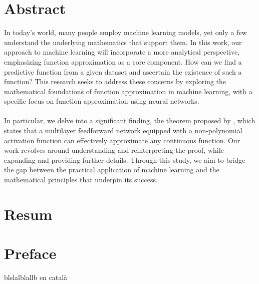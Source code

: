 \documentclass[../../main.tex]{subfiles}
\begin{document}
\chapter*{Abstract}\label{ch:abstract} 
\noindent In today's world, many people employ machine learning models, yet only a few understand the underlying mathematics that support them. In this work, our approach to machine learning will incorporate a more analytical perspective, emphasizing function approximation as a core component. How can we find a predictive function from a given dataset and ascertain the existence of such a function? This research seeks to address these concerns by exploring the mathematical foundations of function approximation in machine learning, with a specific focus on function approximation using neural networks.
\\ \\
In particular, we delve into a significant finding, the theorem proposed by \cite{leshno1993multilayer}, which states that a multilayer feedforward network equipped with a non-polynomial activation function can effectively approximate any continuous function. Our work revolves around understanding and reinterpreting the proof, while expanding and providing further details.
Through this study, we aim to bridge the gap between the practical application of machine learning and the mathematical principles that underpin its success.




\chapter*{Resum}

\chapter*{Preface}



blslalblallb en català
\end{document}
